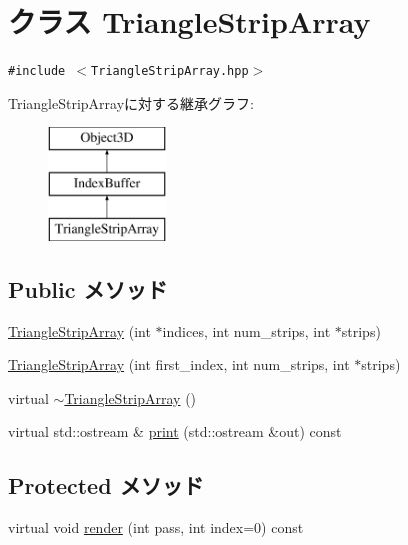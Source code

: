 \hypertarget{classm3g_1_1TriangleStripArray}{
\section{クラス TriangleStripArray}
\label{classm3g_1_1TriangleStripArray}
}
{\tt \#include $<$TriangleStripArray.hpp$>$}

TriangleStripArrayに対する継承グラフ:\begin{figure}[H]
\begin{center}
\leavevmode
\includegraphics[height=3cm]{classm3g_1_1TriangleStripArray}
\end{center}
\end{figure}
\subsection*{Public メソッド}
\begin{CompactItemize}
\item 
\hyperlink{classm3g_1_1TriangleStripArray_57d4e874819367084aeadb11593c4436}{TriangleStripArray} (int $\ast$indices, int num\_\-strips, int $\ast$strips)
\item 
\hyperlink{classm3g_1_1TriangleStripArray_d2ca9884a6ccf32da3cee977549b5ee0}{TriangleStripArray} (int first\_\-index, int num\_\-strips, int $\ast$strips)
\item 
virtual \hyperlink{classm3g_1_1TriangleStripArray_1cb3853bf79b7710d57044da818d2cde}{$\sim$TriangleStripArray} ()
\item 
virtual std::ostream \& \hyperlink{classm3g_1_1TriangleStripArray_6fea17fa1532df3794f8cb39cb4f911f}{print} (std::ostream \&out) const 
\end{CompactItemize}
\subsection*{Protected メソッド}
\begin{CompactItemize}
\item 
virtual void \hyperlink{classm3g_1_1TriangleStripArray_1efcb1973989d9963d5bd6d03065d389}{render} (int pass, int index=0) const 
\end{CompactItemize}
